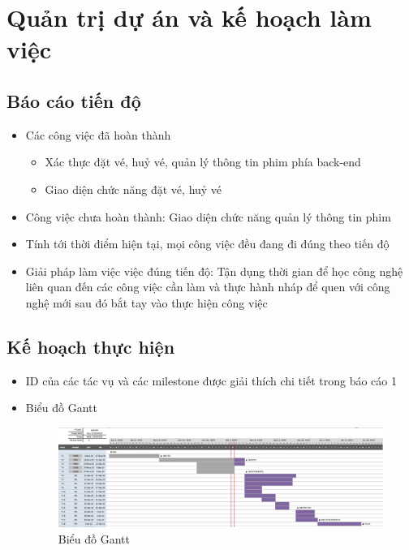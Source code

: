 \documentclass[a4paper, 12pt]{article}
\begin{document}
\clearpage

\section{Quản trị dự án và kế hoạch làm việc}

\subsection{Báo cáo tiến độ}

\begin{itemize}
	\item Các công việc đã hoàn thành
	\begin{itemize}
		\item Xác thực đặt vé, huỷ vé, quản lý thông tin phim phía back-end
		\item Giao diện chức năng đặt vé, huỷ vé
	\end{itemize}
	\item Công việc chưa hoàn thành: Giao diện chức năng quản lý thông tin phim 

	\item Tính tới thời điểm hiện tại, mọi công việc đều đang đi đúng theo tiến độ
	\item Giải pháp làm việc việc đúng tiến độ: Tận dụng thời gian để học công nghệ liên quan đến các công việc cần làm và thực hành nháp để quen với công nghệ mới sau đó bắt tay vào thực hiện công việc
\end{itemize}

\clearpage 

\subsection{Kế hoạch thực hiện}

\begin{itemize}
	\item ID của các tác vụ và các milestone được giải thích chi tiết trong báo cáo 1
	\item Biểu đồ Gantt 
	\begin{figure}[H]
		\begin{center}
			\includegraphics[scale=0.59, angle=90]{./image/gantt.png}
			\caption{Biểu đồ Gantt}
		\end{center}
	\end{figure}
\end{itemize}
\end{document}
